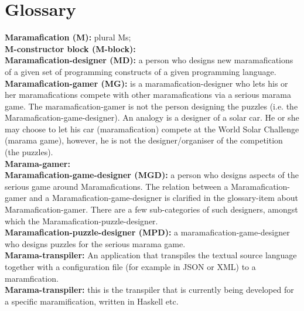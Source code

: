 
\section{Glossary}
\textbf{Maramafication (M):} plural Ms;
\vspace{2mm}\\ %
\textbf{M-constructor block (M-block):}
\vspace{2mm}\\
\textbf{Maramafication-designer (MD):} a person who designs new maramafications of a given set of programming constructs of a given programming language.
\vspace{2mm}\\
\textbf{Maramafication-gamer (MG):} is a maramafication-designer who lets his or her maramafications compete with other maramafications via a serious marama game. The maramafication-gamer is not the person designing the puzzles (i.e. the Maramafication-game-designer). An analogy is a designer of a solar car. He or she may choose to let his car (maramafication) compete at the World Solar Challenge (marama game), however, he is not the designer/organiser of the competition (the puzzles).
\vspace{2mm}\\
\textbf{Marama-gamer:}
\vspace{2mm}\\
\textbf{Maramafication-game-designer (MGD):} a person who designs aspects of the serious game around Maramafications. The relation between a Maramafication-gamer and a Maramafication-game-designer is clarified in the glossary-item about Maramafication-gamer. There are a few sub-categories of such designers, amongst which the Maramafication-puzzle-designer.
\vspace{2mm}\\
\textbf{Maramafication-puzzle-designer (MPD):} a maramafication-game-designer who designs puzzles for the serious marama game.
\vspace{2mm}\\
\textbf{Marama-transpiler:} An application that transpiles the textual source language together with a configuration file (for example in JSON or XML) to a maramfication.
\vspace{2mm}\\
\textbf{Marama-transpiler:} this is the transpiler that is currently being developed for a specific maramification, written in Haskell etc.
\vspace{2mm}\\
